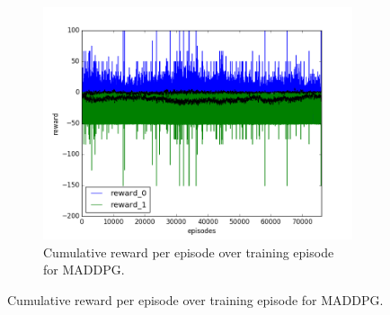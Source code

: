 \begin{figure}[h]
\begin{subfigure}[h]{\figscale\linewidth}
    \includegraphics[trim=10 10 10 10,clip,width=\linewidth]
    {../results/maddpg_1vs1/reward.png}
    \caption{Cumulative reward per episode over training episode for MADDPG.}
    \label{fig:maddpg-1vs1-reward}
  \end{subfigure}


\end{figure}
